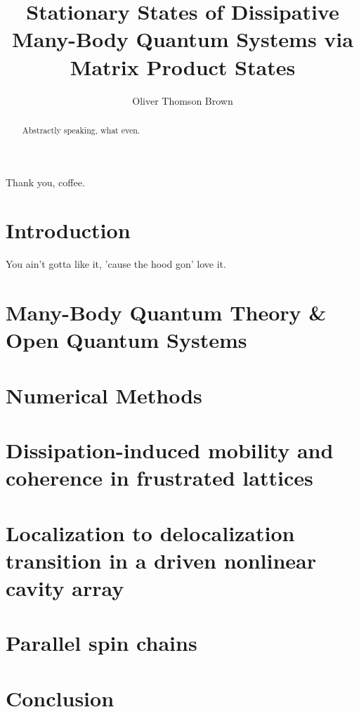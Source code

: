 \documentclass[a4paper,oneside,12pt]{hwthesis}
\author{Oliver Thomson Brown}
\title{Stationary States of Dissipative Many-Body Quantum Systems via Matrix Product States}
\newcommand*{\chappath}{../../include/chapters}
\newcommand*{\refpath}{../../include/refs}
\begin{document}
\maketitle


\begin{acknowledgements}
Thank you, coffee.
\end{acknowledgements}

\begin{abstract}
Abstractly speaking, what even.
\end{abstract}

\tableofcontents

\chapter{Introduction}
\setcounter{page}{1}
You ain't gotta like it, 'cause the hood gon' love it.

\chapter{Many-Body Quantum Theory \& Open Quantum Systems}


\chapter{Numerical Methods}



\chapter{Dissipation-induced mobility and coherence in frustrated lattices}

\chapter{Localization to delocalization transition in a driven nonlinear cavity array}

\chapter{Parallel spin chains}

\chapter{Conclusion}



\end{document}
